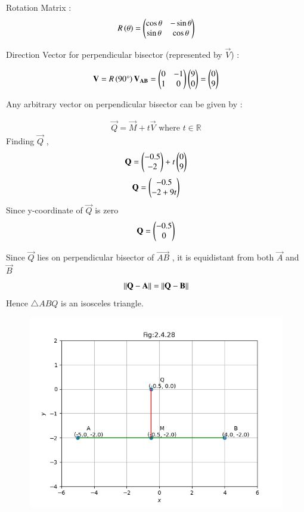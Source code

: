 \documentclass[journal]{IEEEtran}
\numberwithin{equation}{enumi}
\numberwithin{figure}{enumi}
\begin{document}
Rotation Matrix : 
\begin{align}
    R\left(\theta\right) = \begin{pmatrix}\cos{\theta} & -\sin{\theta} \\ \sin{\theta} & \cos{\theta}\end{pmatrix}
\end{align}

Direction Vector for perpendicular bisector (represented by $\vec{V}$) : 

\begin{align}
    \mathbf{V} = R\left(90 \degree \right)\mathbf{V_{AB}} = \begin{pmatrix}0 & -1 \\ 1 & 0\end{pmatrix}\begin{pmatrix}9 \\ 0\end{pmatrix} = \begin{pmatrix}0 \\ 9 \end{pmatrix}
\end{align}

Any arbitrary vector on perpendicular bisector can be given by : 

\begin{align}
    \vec{Q} = \vec{M} + t\vec{V} \text{ where } t \in \mathbb{R}
\end{align}
Finding $\vec{Q}$ , 
\begin{align}
    \mathbf{Q} = \begin{pmatrix}-0.5 \\ -2 \end{pmatrix} + t\begin{pmatrix}0 \\ 9\end{pmatrix} 
\end{align}
\begin{align}
    \mathbf{Q} = \begin{pmatrix}-0.5 \\ -2 + 9t\end{pmatrix}
\end{align}
Since y-coordinate of $\vec{Q}$ is zero 
\begin{align}
    \mathbf{Q} = \begin{pmatrix}-0.5 \\ 0 \end{pmatrix}
\end{align}

Since $\vec{Q}$ lies on perpendicular bisector of $\vec{AB}$ , it is equidistant from both $\vec{A}$ and $\vec{B}$
\begin{align}
    \left\lVert\mathbf{Q} - \mathbf{A}\right\rVert = \left\lVert\mathbf{Q} - \mathbf{B}\right\rVert
\end{align}
Hence $\triangle ABQ$ is an isosceles triangle.


\begin{figure}[H]
    \centering
    \includegraphics[width=1\columnwidth]{figs/perpbisector1.png}
    \caption*{}
    \label{fig:}
\end{figure}
\end{document}

